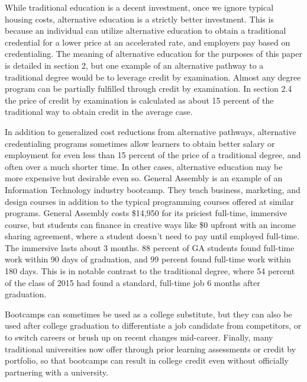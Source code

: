 \documentclass[AER]{/Users/zyl357/Documents/GitHub/research-dissertation-case-for-alt-ed/papers/alt-ed-survey/aea-latex-templates/AEA}
\begin{document}
While traditional education is a decent investment, once we ignore typical
housing costs, alternative education is a strictly better investment. This
is because an individual can utilize alternative education to obtain a
traditional credential for a lower price at an accelerated rate, and
employers pay based on credentialing. The meaning of alternative education
for the purposes of this paper is detailed in section 2, but one example
of an alternative pathway to a traditional degree would be to leverage
credit by examination. Almost any degree program can be partially
fulfilled through credit by examination. In section 2.4 the price of
credit by examination is calculated as about 15 percent of the traditional way to
obtain credit in the average case.

In addition to generalized cost reductions from alternative pathways,
alternative credentialing programs sometimes allow learners to obtain
better salary or employment for even less than 15 percent of the price of a
traditional degree, and often over a much shorter time. In other cases,
alternative education may be more expensive but desirable even so. General
Assembly is an example of an Information Technology industry bootcamp.
They teach business, marketing, and design courses in addition to the
typical programming courses offered at similar programs. General Assembly
costs \$14,950 for its priciest full-time, immersive course, but students
can finance in creative ways like \$0 upfront with an income sharing
agreement, where a student doesn’t need to pay until employed full-time\cite{ga2019}.
The immersive lasts about 3 months. 88 percent of GA students found full-time
work within 90 days of graduation, and 99 percent found full-time work within 180
days\cite{kirkham_2017}. This is in notable contrast to the traditional degree, where 54 percent of
the class of 2015 had found a standard, full-time job 6 months after
graduation\cite{wexler_2016}.

Bootcamps can sometimes be used as a college substitute, but they can also
be used after college graduation to differentiate a job candidate from
competitors, or to switch careers or brush up on recent changes
mid-career. Finally, many traditional universities now offer through prior
learning assessments or credit by portfolio, so that bootcamps can result
in college credit even without officially partnering with a university\cite{aceposttraditionallearners}.
\end{document}
